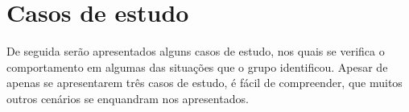 \chapter[Casos de estudo]
{Casos de estudo}

De seguida serão apresentados alguns casos de estudo, nos quais se verifica o comportamento em algumas das situações que o grupo identificou. Apesar de apenas se apresentarem três casos de estudo, é fácil de compreender, que muitos outros cenários se enquandram nos apresentados.



